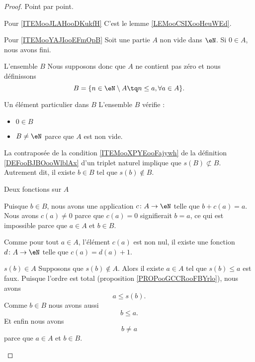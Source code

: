 \begin{proof}
    Point par point.
    \begin{subproof}
    \item[Pour \ref{ITEMooJLAHooDKukfH}]
        C'est le lemme \ref{LEMooCSIXooHeuWEd}.

    \item[Pour \ref{ITEMooYAJIooEFmOpB}]
        Soit une partie \( A\) non vide dans \( \eN\). Si \( 0\in A\), nous avons fini. 
        \begin{subproof}
        \item[L'ensemble \( B\)]
        Nous supposons donc que \( A\) ne contient pas zéro et nous définissons
        \begin{equation}
            B=\{ n\in \eN\setminus A\tq n\leq a, \forall a\in A \}.
        \end{equation}
    \item[Un élément particulier dans \( B\)]
        L'ensemble \( B\) vérifie :
        \begin{itemize}
            \item \( 0\in B\)
            \item \( B\neq \eN\) parce que \( A\) est non vide.
        \end{itemize}
        La contraposée de la condition \ref{ITEMooXPYEooFajywh} de la définition \ref{DEFooBJBOooWlblAx} d'un triplet naturel implique que \( s(B)\nsubset B\). Autrement dit, il existe \( b\in B\) tel que \( s(b)\notin B\).

    \item[Deux fonctions sur \( A\)]

        Puisque \( b\in B\), nous avons une application \( c\colon A\to \eN\) telle que \( b+c(a)=a\). Nous avons \( c(a)\neq 0\) parce que \( c(a)=0\) signifierait \( b=a\), ce qui est impossible parce que \( a\in A\) et \( b\in B\).

        Comme pour tout \( a\in A\), l'élément \( c(a)\) est non nul, il existe une fonction \( d\colon A\to \eN\) telle que \( c(a)=d(a)+1\).
    \item[\( s(b)\in A\)]
        Supposons que \( s(b)\notin A\). Alors il existe \( a\in A\) tel que \( s(b)\leq a\) est faux. Puisque l'ordre est total (proposition \ref{PROPooGCCRooFBYrlo}), nous avons
        \begin{equation}        \label{EQooYQSFooPSPJMt}
            a\leq s(b).
        \end{equation}
        Comme \( b\in B\) nous avons aussi
        \begin{equation}        \label{EQooIPAWooDBSJEa}
            b\leq a.
        \end{equation}
        Et enfin nous avons
        \begin{equation}        \label{EQooWFHRooGDSBFD}
            b\neq a
        \end{equation}
        parce que \( a\in A\) et \( b\in B\).


\end{subproof}
\end{subproof}
\end{proof}
